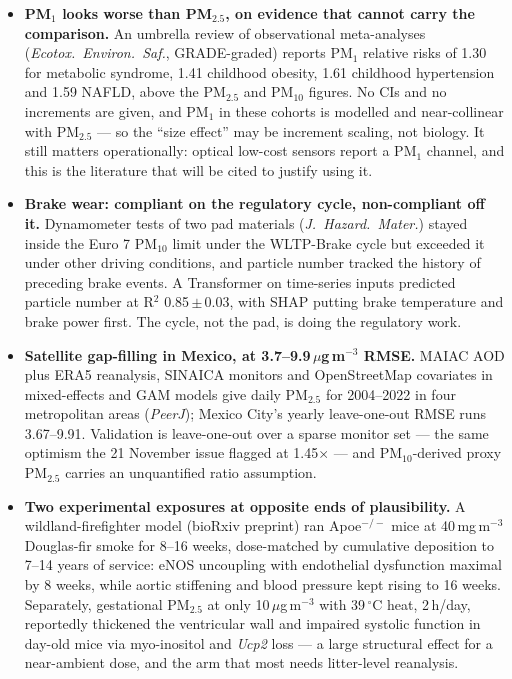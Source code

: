 \documentclass[10pt]{article}
\begin{document}
\footnotesize
\begin{itemize}

\item \textbf{PM$_1$ looks worse than PM$_{2.5}$, on evidence that cannot carry the comparison.} An umbrella review of observational meta-analyses (\textit{Ecotox.\ Environ.\ Saf.}, GRADE-graded) reports PM$_1$ relative risks of 1.30 for metabolic syndrome, 1.41 childhood obesity, 1.61 childhood hypertension and 1.59 NAFLD, above the PM$_{2.5}$ and PM$_{10}$ figures. No CIs and no increments are given, and PM$_1$ in these cohorts is modelled and near-collinear with PM$_{2.5}$ --- so the ``size effect'' may be increment scaling, not biology. It still matters operationally: optical low-cost sensors report a PM$_1$ channel, and this is the literature that will be cited to justify using it.

\item \textbf{Brake wear: compliant on the regulatory cycle, non-compliant off it.} Dynamometer tests of two pad materials (\textit{J.\ Hazard.\ Mater.}) stayed inside the Euro 7 PM$_{10}$ limit under the WLTP-Brake cycle but exceeded it under other driving conditions, and particle number tracked the history of preceding brake events. A Transformer on time-series inputs predicted particle number at R$^2$ 0.85\,$\pm$\,0.03, with SHAP putting brake temperature and brake power first. The cycle, not the pad, is doing the regulatory work.

\item \textbf{Satellite gap-filling in Mexico, at 3.7--9.9\,$\mu$g\,m$^{-3}$ RMSE.} MAIAC AOD plus ERA5 reanalysis, SINAICA monitors and OpenStreetMap covariates in mixed-effects and GAM models give daily PM$_{2.5}$ for 2004--2022 in four metropolitan areas (\textit{PeerJ}); Mexico City's yearly leave-one-out RMSE runs 3.67--9.91. Validation is leave-one-out over a sparse monitor set --- the same optimism the 21 November issue flagged at 1.45$\times$ --- and PM$_{10}$-derived proxy PM$_{2.5}$ carries an unquantified ratio assumption.

\item \textbf{Two experimental exposures at opposite ends of plausibility.} A wildland-firefighter model (bioRxiv preprint) ran Apoe$^{-/-}$ mice at 40\,mg\,m$^{-3}$ Douglas-fir smoke for 8--16 weeks, dose-matched by cumulative deposition to 7--14 years of service: eNOS uncoupling with endothelial dysfunction maximal by 8 weeks, while aortic stiffening and blood pressure kept rising to 16 weeks. Separately, gestational PM$_{2.5}$ at only 10\,$\mu$g\,m$^{-3}$ with 39\,$^\circ$C heat, 2\,h/day, reportedly thickened the ventricular wall and impaired systolic function in day-old mice via myo-inositol and \textit{Ucp2} loss --- a large structural effect for a near-ambient dose, and the arm that most needs litter-level reanalysis.


\end{itemize}
\end{document}
